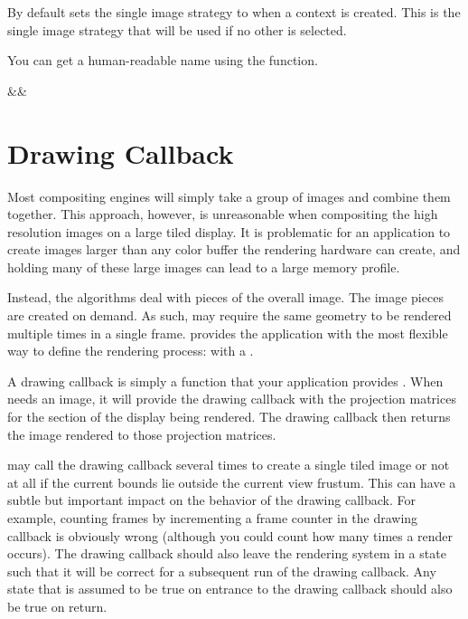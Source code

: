 

By default \IceT sets the single image strategy to
 when a context is created.
This is the single image strategy that will be used if no other is
selected.

You can get a human-readable name using the
 function.

\begin{Table}{3}
  \textC{(}&&\textC{);}
\end{Table}



\section{Drawing Callback}
\label{sec:Basic_Usage::Drawing_Callback}


Most compositing engines will simply take a group of images and combine them
together.  This approach, however, is unreasonable when compositing the
high resolution images on a large tiled display.  It is problematic for an
application to create images larger than any color buffer the rendering
hardware can create, and holding many of these large images can lead to a
large memory profile.

Instead, the \IceT algorithms deal with pieces of the overall image.  The
image pieces are created on demand.  As such, \IceT may require the same
geometry to be rendered multiple times in a single frame.  \IceT provides
the application with the most flexible way to define the rendering process:
with a .

A drawing callback is simply a function that your application provides
\IceT.  When \IceT needs an image, it will provide the drawing callback
with the projection matrices for the section of the display being
rendered.  The drawing callback then returns the image rendered to those
projection matrices.

\IceT may call the drawing callback several times to create a single tiled
image or not at all if the current bounds lie outside the current view
frustum.  This can have a subtle but important impact on the behavior of
the drawing callback.  For example, counting frames by incrementing a frame
counter in the drawing callback is obviously wrong (although you could
count how many times a render occurs).  The drawing callback should also
leave the rendering system in a state such that it will be correct for a
subsequent run of the drawing callback.  Any state that is assumed to be
true on entrance to the drawing callback should also be true on return.

